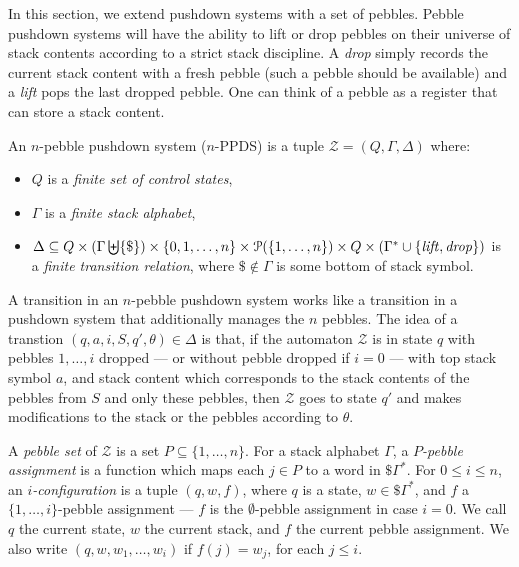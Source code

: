 \documentclass[a4paper,UKenglish,cleveref, autoref, thm-restate]{lipics-v2021}
\begin{document}
In this section, we extend pushdown systems with a set of pebbles. 
Pebble pushdown systems will have the ability to lift or drop pebbles on their universe of stack contents according to a strict stack discipline. A \textit{drop} simply records the current stack content with a fresh pebble (such a pebble should be available) and a \textit{lift} pops the last dropped pebble. One can think of a pebble as a register that can store a stack content.




\begin{definition}
An $n$-pebble pushdown system ($n$-PPDS) is a tuple $\mathcal{Z} = (Q, \Gamma,  \Delta )$
where:
\begin{itemize}
\item $Q$ is a {\em finite set of control states},
\item $\Gamma$ is a {\em finite stack alphabet},
\item  $\Delta   \subseteq  Q  \times (\Gamma \biguplus \{ \$ \})  \times \{ 0, 1, \ldots, n\} \times \mathcal{P}(\{ 1, \ldots, n\}) \times Q  \times (\Gamma^* \cup \{ \! \! \text{\textit{lift}}, \text{\textit{drop}}\})$ is a {\em finite transition relation}, where ${\$ \notin \Gamma}$ is some bottom of stack symbol.
\end{itemize}
\end{definition}


A transition in an $n$-pebble pushdown system works like a transition in a pushdown system that additionally manages the $n$ pebbles.
The idea of a transtion $(q, a, i, S, q', \theta) \in \Delta$
is that, if the automaton $\mathcal{Z}$ is in state $q$ with pebbles $1,\ldots, i$ dropped \---- or without pebble dropped if $i = 0$ \---- with top stack symbol $a$, and stack content which corresponds to the stack contents of the pebbles from $S$ and only these pebbles, then
$\mathcal{Z}$ goes to state 
$q'$ and makes modifications to the stack or the pebbles according to
$\theta$.



A {\em pebble set} of $\mathcal{Z}$ is a set $P \subseteq \{ 1, \ldots, n\}$. For a stack alphabet $\Gamma$, a 
{\em $P$-pebble assignment} is a function which maps each $j \in P$ to a word in $\$\Gamma^*$.
For $0 \leq i \leq n$, an {\em $i$-configuration} is a tuple $(q, w, f )$, where 
$q$ is a state,
$w \in \$\Gamma^*$, and
$f$ a $\{ 1, \ldots , i \}$-pebble assignment \---- $f$ is the $\emptyset$-pebble assignment in case $i=0$. 
We call  $q$ the current state, $w$ the current stack, and
$f$ the current pebble assignment. 
We also write $(q,w, w_{1} , \ldots , w_{i} )$ if 
$f(j) = w_j$, for each
$j \leq i$.
\end{document}
